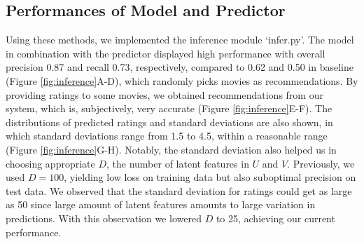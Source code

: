 \documentclass{article}
\begin{document}
\subsection{Performances of Model and Predictor}
Using these methods, we implemented the inference module `infer.py'. The model in combination with the predictor displayed high performance with overall precision 0.87 and recall 0.73, respectively, compared to 0.62 and 0.50 in baseline (Figure \ref{fig:inference}A-D), which randomly picks movies as recommendations. By providing ratings to some movies, we obtained recommendations from our system, which is, subjectively, very accurate (Figure \ref{fig:inference}E-F). The distributions of predicted ratings and standard deviations are also shown, in which standard deviations range from 1.5 to 4.5, within a reasonable range (Figure \ref{fig:inference}G-H). Notably, the standard deviation also helped us in choosing appropriate $D$, the number of latent features in $U$ and $V$. Previously, we used $D=100$, yielding low loss on training data but also suboptimal precision on test data. We observed that the standard deviation for ratings could get as large as 50 since large amount of latent features amounts to large variation in predictions. With this observation we lowered $D$ to 25, achieving our current performance.
\end{document}
